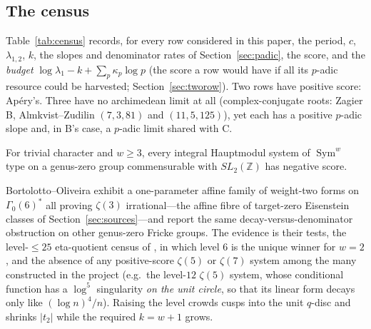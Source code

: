\subsection{The census}


Table~\ref{tab:census} records, for every row considered in this paper, the period, $c$, $\lambda_{1,2}$, $k$, the slopes and denominator rates of Section~\ref{sec:padic}, the score, and the \emph{budget} $\log\lambda_1-k+\sum_p\kappa_p\log p$ (the score a row would have if all its $p$-adic resource could be harvested; Section~\ref{sec:tworow}). Two rows have positive score: Ap\'ery's. Three have no archimedean limit at all (complex-conjugate roots: Zagier B, Almkvist--Zudilin $(7,3,81)$ and $(11,5,125)$), yet each has a positive $p$-adic slope and, in B's case, a $p$-adic limit shared with C.

\begin{conjecture}\label{conj:barrier}
For trivial character and $w\ge3$, every integral Hauptmodul system of $\operatorname{Sym}^w$ type on a genus-zero group commensurable with $SL_2(\mathbb Z)$ has negative score.
\end{conjecture}
Bortolotto--Oliveira \cite{BortolottoOliveira2026} exhibit a one-parameter affine family of weight-two forms on $\Gamma_0(6)^*$ all proving $\zeta(3)$ irrational---the affine fibre of target-zero Eisenstein classes of Section~\ref{sec:sources}---and report the same decay-versus-denominator obstruction on other genus-zero Fricke groups. The evidence is their tests, the level-$\le25$ eta-quotient census of \cite{ProjectRace}, in which level $6$ is the unique winner for $w=2$, and the absence of any positive-score $\zeta(5)$ or $\zeta(7)$ system among the many constructed in the project (e.g.\ the level-$12$ $\zeta(5)$ system, whose conditional function has a $\log^5$ singularity \emph{on the unit circle}, so that its linear form decays only like $(\log n)^4/n$). Raising the level crowds cusps into the unit $q$-disc and shrinks $|t_2|$ while the required $k=w+1$ grows.
